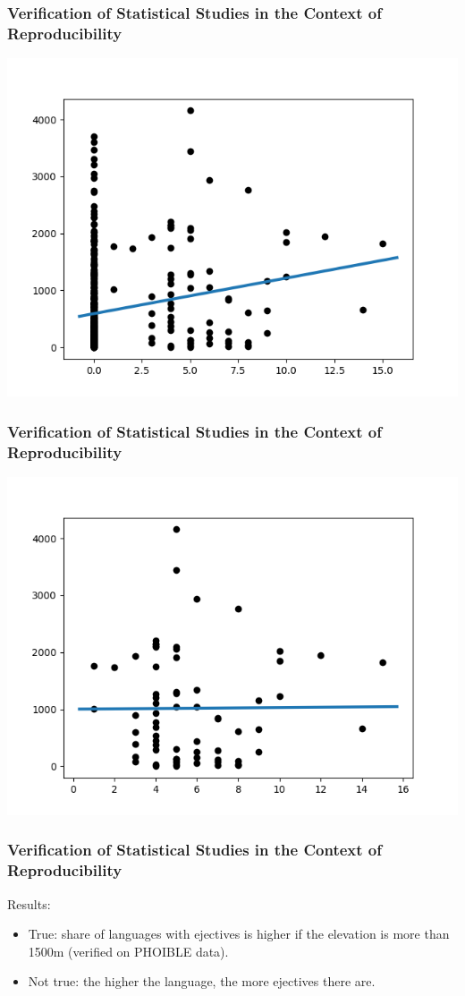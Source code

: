 \documentclass{beamer}
\begin{document}
\begin{frame}
\frametitle{Verification of Statistical Studies in the Context of Reproducibility}
\includegraphics[width=\textwidth]{images/linear_regression_raisedLarynxEjective_all.png}
\end{frame}

\begin{frame}
\frametitle{Verification of Statistical Studies in the Context of Reproducibility}
\includegraphics[width=\textwidth]{images/linear_regression_raisedLarynxEjective_only.png}
\end{frame}

\begin{frame}
\frametitle{Verification of Statistical Studies in the Context of Reproducibility}
Results:
\begin{itemize}
 \item True: share of languages with ejectives is higher if the elevation is more than 1500m (verified on PHOIBLE data).
 \item Not true: the higher the language, the more ejectives there are.
\end{itemize}
\end{frame}
\end{document}
